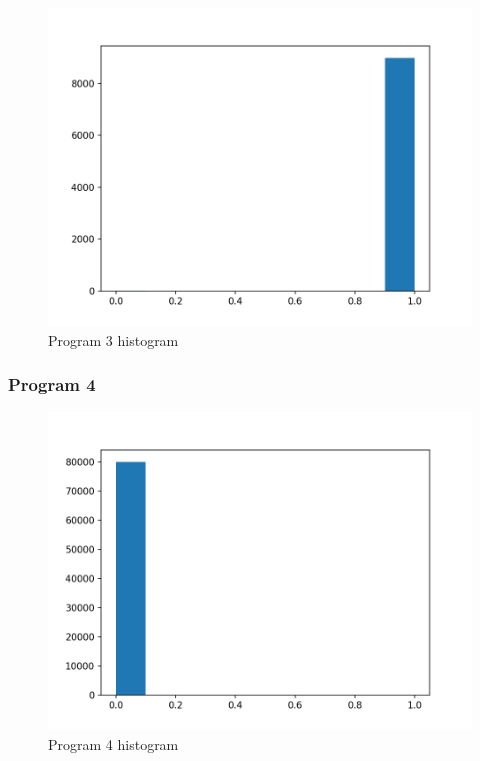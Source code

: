 \documentclass[12pt]{article}%
\theoremstyle{definition}
\begin{document}
	\begin{figure}[h]
		\centering
		\includegraphics[scale=0.4]{p3histogram.png}
		\caption{Program 3 histogram }
	\end{figure}
	
		\subsubsection{Program 4}
		
		\begin{figure}[h]
			\centering
			\includegraphics[scale=0.4]{p4histogram.png}
			\caption{Program 4 histogram }
		\end{figure}
	
%	
%	
	
	
\end{document}
